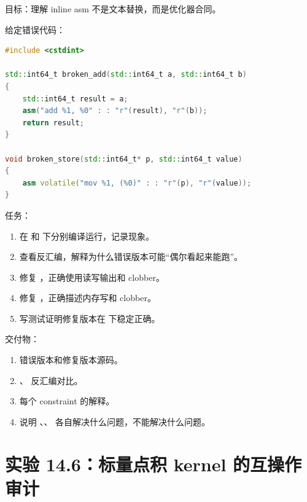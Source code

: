 \begin{labbox}
目标：理解 inline asm 不是文本替换，而是优化器合同。

给定错误代码：

\begin{lstlisting}[language=C++]
#include <cstdint>

std::int64_t broken_add(std::int64_t a, std::int64_t b)
{
    std::int64_t result = a;
    asm("add %1, %0" : : "r"(result), "r"(b));
    return result;
}

void broken_store(std::int64_t* p, std::int64_t value)
{
    asm volatile("mov %1, (%0)" : : "r"(p), "r"(value));
}
\end{lstlisting}

任务：

\begin{enumerate}
  \item 在  和  下分别编译运行，记录现象。
  \item 查看反汇编，解释为什么错误版本可能“偶尔看起来能跑”。
  \item 修复 ，正确使用读写输出和  clobber。
  \item 修复 ，正确描述内存写和  clobber。
  \item 写测试证明修复版本在  下稳定正确。
\end{enumerate}

交付物：

\begin{enumerate}
  \item 错误版本和修复版本源码。
  \item {}、 反汇编对比。
  \item 每个 constraint 的解释。
  \item 说明 、、 各自解决什么问题，不能解决什么问题。
\end{enumerate}
\end{labbox}

\section{实验 14.6：标量点积 kernel 的互操作审计}

